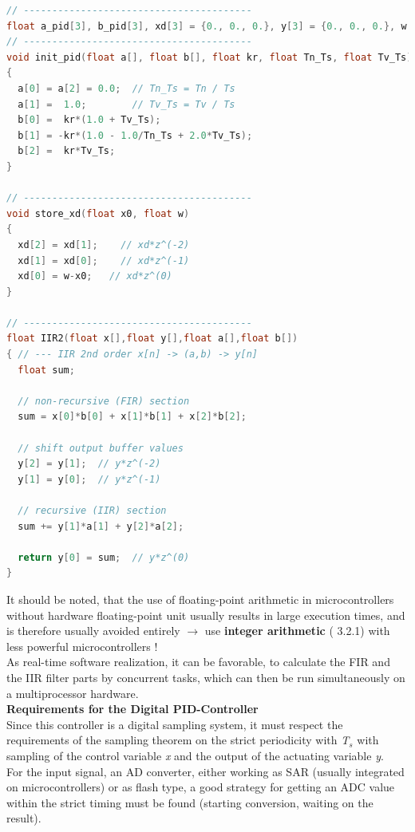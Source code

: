 \begin{lstlisting}[style=mystyle, language=c]
// ----------------------------------------
float a_pid[3], b_pid[3], xd[3] = {0., 0., 0.}, y[3] = {0., 0., 0.}, w = 0.;
// ----------------------------------------
void init_pid(float a[], float b[], float kr, float Tn_Ts, float Tv_Ts)
{
  a[0] = a[2] = 0.0;  // Tn_Ts = Tn / Ts
  a[1] =  1.0;        // Tv_Ts = Tv / Ts
  b[0] =  kr*(1.0 + Tv_Ts);
  b[1] = -kr*(1.0 - 1.0/Tn_Ts + 2.0*Tv_Ts);
  b[2] =  kr*Tv_Ts;
}

// ----------------------------------------
void store_xd(float x0, float w)
{
  xd[2] = xd[1];    // xd*z^(-2)
  xd[1] = xd[0];    // xd*z^(-1)
  xd[0] = w-x0;   // xd*z^(0)
}

// ----------------------------------------
float IIR2(float x[],float y[],float a[],float b[])
{ // --- IIR 2nd order x[n] -> (a,b) -> y[n] 
  float sum;

  // non-recursive (FIR) section
  sum = x[0]*b[0] + x[1]*b[1] + x[2]*b[2];

  // shift output buffer values
  y[2] = y[1];  // y*z^(-2)
  y[1] = y[0];  // y*z^(-1)

  // recursive (IIR) section
  sum += y[1]*a[1] + y[2]*a[2];

  return y[0] = sum;  // y*z^(0)
}
\end{lstlisting}

It should be noted, that the use of floating-point arithmetic in microcontrollers without hardware floating-point unit usually results in large execution times, and is therefore usually avoided entirely $\rightarrow$ use \textbf{integer arithmetic} ( 3.2.1) with less powerful microcontrollers !\\

As real-time software realization, it can be favorable, to calculate the FIR and the IIR filter parts by concurrent tasks, which can then be run simultaneously on a multiprocessor hardware.\\

{\rot\bf Requirements for the Digital PID-Controller}\\

Since this controller is a digital sampling system, it must respect the requirements of the sampling theorem on the strict periodicity with \textit{T${}_{s}$} with sampling of the control variable \textit{x} and the output of the actuating variable \textit{y}. \\

For the input signal, an AD converter, either working as SAR (usually integrated on microcontrollers) or as flash type, a good strategy for getting an ADC value within the strict timing must be found (starting conversion, waiting on the result).\\

